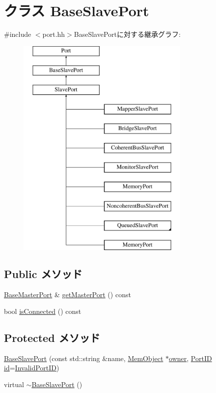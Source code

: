 \hypertarget{classBaseSlavePort}{
\section{クラス BaseSlavePort}
\label{classBaseSlavePort}
}


{\ttfamily \#include $<$port.hh$>$}BaseSlavePortに対する継承グラフ:\begin{figure}[H]
\begin{center}
\leavevmode
\includegraphics[height=11cm]{classBaseSlavePort}
\end{center}
\end{figure}
\subsection*{Public メソッド}
\begin{DoxyCompactItemize}
\item 
\hyperlink{classBaseMasterPort}{BaseMasterPort} \& \hyperlink{classBaseSlavePort_a0ac9bcda7a99ed66768dfe5c4a8b7e5f}{getMasterPort} () const 
\item 
bool \hyperlink{classBaseSlavePort_a180fa55a4bf36580963bed9e3e09c227}{isConnected} () const 
\end{DoxyCompactItemize}
\subsection*{Protected メソッド}
\begin{DoxyCompactItemize}
\item 
\hyperlink{classBaseSlavePort_a414cdc348be270fd5d327495492317f3}{BaseSlavePort} (const std::string \&name, \hyperlink{classMemObject}{MemObject} $\ast$\hyperlink{classPort_aba966efb6c1df4b015be3a396df6c318}{owner}, \hyperlink{base_2types_8hh_acef4d7d41cb21fdc252e20c04cd7bb8e}{PortID} \hyperlink{classPort_a0a67444fc1c33a60fe4a92bfff05d0cb}{id}=\hyperlink{base_2types_8hh_a65bf40f138cf863f0c5e2d8ca1144126}{InvalidPortID})
\item 
virtual \hyperlink{classBaseSlavePort_af5de8ca1b8bfbd68a5fe3795a7b4d1ec}{$\sim$BaseSlavePort} ()
\end{DoxyCompactItemize}
